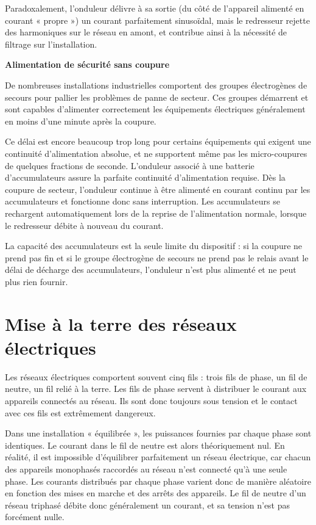 Paradoxalement, l’onduleur délivre à sa sortie (du côté de l’appareil alimenté en courant « propre ») un courant parfaitement sinusoïdal, mais le redresseur rejette des harmoniques sur le réseau en amont, et contribue ainsi à la nécessité de filtrage sur l’installation.

\vspace{0.3cm}
\textbf{Alimentation de sécurité sans coupure}
\vspace{0.3cm}

De nombreuses installations industrielles comportent des groupes électrogènes de secours pour pallier les problèmes de panne de secteur. Ces groupes démarrent et sont capables d’alimenter correctement les équipements électriques généralement en moins d’une minute après la coupure.
\vspace{0.3cm}

Ce délai est encore beaucoup trop long pour certains équipements qui exigent une continuité d’alimentation absolue, et ne supportent même pas les micro-coupures de quelques fractions de seconde.
L’onduleur associé à une batterie d’accumulateurs assure la parfaite continuité d’alimentation requise. Dès la coupure de secteur, l’onduleur continue à être alimenté en courant continu par les accumulateurs et fonctionne donc sans interruption. Les accumulateurs se rechargent automatiquement lors de la reprise de l’alimentation normale, lorsque le redresseur débite à nouveau du courant.
\vspace{0.3cm}

La capacité des accumulateurs est la seule limite du dispositif : si la coupure ne prend pas fin et si le groupe électrogène de secours ne prend pas le relais avant le délai de décharge des accumulateurs, l’onduleur n’est plus alimenté et ne peut plus rien fournir.

\section{Mise à la terre des réseaux électriques}

Les réseaux électriques comportent souvent cinq fils : trois fils de phase, un fil de neutre, 
un fil relié à la terre. Les fils de phase servent à distribuer le courant aux appareils connectés au réseau. Ils sont donc toujours sous tension et le contact avec ces fils est extrêmement dangereux.
\vspace{0.3cm}

Dans une installation « équilibrée », les puissances fournies par chaque phase sont identiques. Le courant dans le fil de neutre est alors théoriquement nul. En réalité, il est impossible d’équilibrer parfaitement un réseau électrique, car chacun des appareils monophasés raccordés au réseau n’est connecté qu’à une seule phase. Les courants distribués par chaque phase varient donc de manière aléatoire en fonction des mises en marche et des arrêts des appareils.
Le fil de neutre d’un réseau triphasé débite donc généralement un courant, et sa tension n’est pas forcément nulle.
\vspace{0.3cm}

